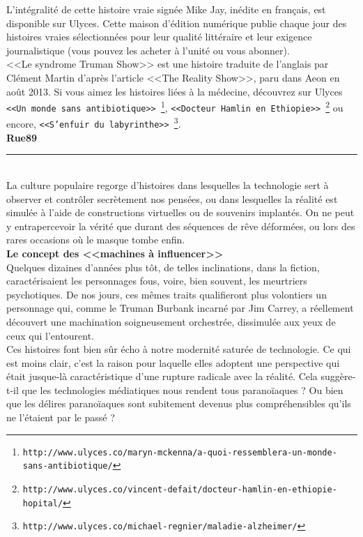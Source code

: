\documentclass[11pt,twoside,a4paper]{article}
\begin{document}
\begin{minipage}[ht]{0.33\textwidth}
	L'int{\'e}gralit{\'e} de cette histoire vraie sign{\'e}e Mike Jay, in{\'e}dite en fran\c{c}ais, est disponible sur Ulyces. Cette maison d'{\'e}dition num{\'e}rique publie chaque jour des histoires vraies s{\'e}lectionn{\'e}es pour leur qualit{\'e} litt{\'e}raire et leur exigence journalistique (vous pouvez les acheter {\`a} l'unit{\'e} ou vous abonner).~\\
	
	<<Le syndrome Truman Show>> est une histoire traduite de l'anglais par Cl{\'e}ment Martin d'apr{\`e}s l'article <<The Reality Show>>, paru dans Aeon en ao{\^u}t 2013. Si vous aimez les histoires li{\'e}es {\`a} la m{\'e}decine, d{\'e}couvrez sur Ulyces \texttt{<<Un monde sans antibiotique>>~\footnote{\texttt{http://www.ulyces.co/maryn-mckenna/a-quoi-ressemblera-un-monde-sans-antibiotique/}}}, \texttt{<<Docteur Hamlin en Ethiopie>>~\footnote{\texttt{http://www.ulyces.co/vincent-defait/docteur-hamlin-en-ethiopie-hopital/}}} ou encore, \texttt{<<S'enfuir du labyrinthe>>~\footnote{\texttt{http://www.ulyces.co/michael-regnier/maladie-alzheimer/}}}.~\\ 
	
	\textbf{Rue89}~\\
	\hrule
\end{minipage}~\\

La culture populaire regorge d'histoires dans lesquelles la technologie sert {\`a} observer et contr{\^o}ler secr{\`e}tement nos pens{\'e}es, ou dans lesquelles la r{\'e}alit{\'e} est simul{\'e}e {\`a} l'aide de constructions virtuelles ou de souvenirs implant{\'e}s. On ne peut y entrapercevoir la v{\'e}rit{\'e} que durant des s{\'e}quences de r{\^e}ve d{\'e}form{\'e}es, ou lors des rares occasions o{\`u} le masque tombe enfin.~\\

\textbf{\Large Le concept des <<machines {\`a} influencer>>}~\\

Quelques dizaines d'ann{\'e}es plus t{\^o}t, de telles inclinations, dans la fiction, caract{\'e}risaient les personnages fous, voire, bien souvent, les meurtriers psychotiques. De nos jours, ces m{\^e}mes traits qualifieront plus volontiers un personnage qui, comme le Truman Burbank incarn{\'e} par Jim Carrey, a r{\'e}ellement d{\'e}couvert une machination soigneusement orchestr{\'e}e, dissimul{\'e}e aux yeux de ceux qui l'entourent.~\\

Ces histoires font bien s{\^u}r {\'e}cho {\`a} notre modernit{\'e} satur{\'e}e de technologie. Ce qui est moins clair, c'est la raison pour laquelle elles adoptent une perspective qui {\'e}tait jusque-l{\`a} caract{\'e}ristique d'une rupture radicale avec la r{\'e}alit{\'e}. Cela sugg{\`e}re-t-il que les technologies m{\'e}diatiques nous rendent tous parano{\"i}aques ? Ou bien que les d{\'e}lires parano{\"i}aques sont subitement devenus plus compr{\'e}hensibles qu'ils ne l'{\'e}taient par le pass{\'e} ?~\\ 
\end{document}
